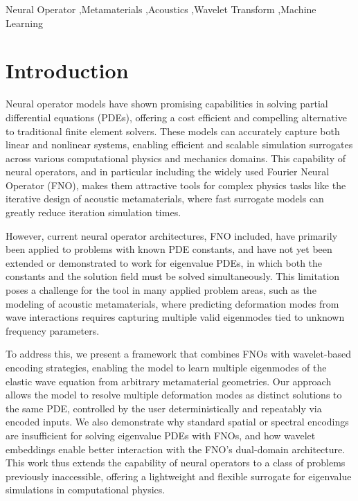 \documentclass[preprint,review,12pt]{elsarticle}
\begin{document}
\begin{frontmatter}
\begin{keyword}
Neural Operator \sep Metamaterials \sep Acoustics \sep Wavelet Transform \sep Machine Learning


\end{keyword}

\end{frontmatter}



\section{Introduction}
\label{introduction}
Neural operator models have shown promising capabilities in solving partial differential equations (PDEs), offering a cost efficient and compelling alternative to traditional finite element solvers. These models can accurately capture both linear and nonlinear systems, enabling efficient and scalable simulation surrogates across various computational physics and mechanics domains. This capability of neural operators, and in particular including the widely used Fourier Neural Operator (FNO), makes them attractive tools for complex physics tasks like the iterative design of acoustic metamaterials, where fast surrogate models can greatly reduce iteration simulation times.

However, current neural operator architectures, FNO included, have primarily been applied to problems with known PDE constants, and have not yet been extended or demonstrated to work for eigenvalue PDEs, in which both the constants and the solution field must be solved simultaneously. This limitation poses a challenge for the tool in many applied problem areas, such as the modeling of acoustic metamaterials, where predicting deformation modes from wave interactions requires capturing multiple valid eigenmodes tied to unknown frequency parameters.

To address this, we present a framework that combines FNOs with wavelet-based encoding strategies, enabling the model to learn multiple eigenmodes of the elastic wave equation from arbitrary metamaterial geometries. Our approach allows the model to resolve multiple deformation modes as distinct solutions to the same PDE, controlled by the user deterministically and repeatably via encoded inputs. We also demonstrate why standard spatial or spectral encodings are insufficient for solving eigenvalue PDEs with FNOs, and how wavelet embeddings enable better interaction with the FNO’s dual-domain architecture. This work thus extends the capability of neural operators to a class of problems previously inaccessible, offering a lightweight and flexible surrogate for eigenvalue simulations in computational physics.
\end{document}
